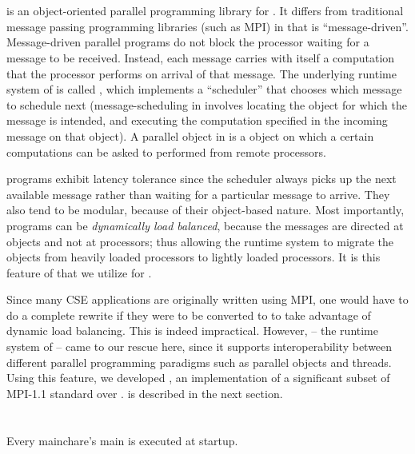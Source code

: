 \documentclass[10pt]{article}
\begin{document}
\section{\charmpp{}}

\charmpp{} is an object-oriented parallel programming library for \CC{}.  It
differs from traditional message passing programming libraries (such as MPI) in
that \charmpp{} is ``message-driven''. Message-driven parallel programs do not
block the processor waiting for a message to be received.  Instead, each
message carries with itself a computation that the processor performs on
arrival of that message. The underlying runtime system of \charmpp{} is called
\converse{}, which implements a ``scheduler'' that chooses which message to
schedule next (message-scheduling in \charmpp{} involves locating the object
for which the message is intended, and executing the computation specified in
the incoming message on that object). A parallel object in \charmpp{} is a
\CC{} object on which a certain computations can be asked to performed from
remote processors.

\charmpp{} programs exhibit latency tolerance since the scheduler always picks
up the next available message rather than waiting for a particular message to
arrive.  They also tend to be modular, because of their object-based nature.
Most importantly, \charmpp{} programs can be \emph{dynamically load balanced},
because the messages are directed at objects and not at processors; thus
allowing the runtime system to migrate the objects from heavily loaded
processors to lightly loaded processors. It is this feature of \charmpp{} that
we utilize for \jade.

Since many CSE applications are originally written using MPI, one would have to
do a complete rewrite if they were to be converted to \charmpp{} to take
advantage of dynamic load balancing. This is indeed impractical. However,
\converse{} -- the runtime system of \charmpp{} -- came to our rescue here,
since it supports interoperability between different parallel programming
paradigms such as parallel objects and threads. Using this feature, we
developed \jade, an implementation of a significant subset of MPI-1.1
standard over \charmpp{}.  \jade is described in the next section.

\section{\jade}

Every mainchare's main is executed at startup.
\end{document}
